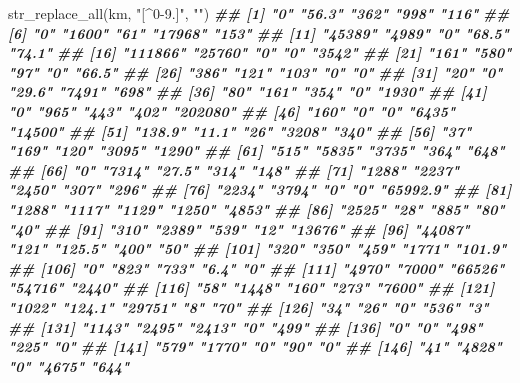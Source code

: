 \documentclass[11pt,german,a4paper]{article}
\newenvironment{Shaded}{\begin{snugshade}}{\end{snugshade}}
\newcommand{\DocumentationTok}[1]{\textcolor[rgb]{0.56,0.35,0.01}{\textbf{\textit{#1}}}}
\newcommand{\FunctionTok}[1]{\textcolor[rgb]{0.00,0.00,0.00}{#1}}
\newcommand{\NormalTok}[1]{#1}
\newcommand{\StringTok}[1]{\textcolor[rgb]{0.31,0.60,0.02}{#1}}
\begin{document}
\begin{Shaded}
\begin{Highlighting}[]
\FunctionTok{str\_replace\_all}\NormalTok{(km, }\StringTok{"[\^{}0{-}9.]"}\NormalTok{, }\StringTok{""}\NormalTok{)}
\DocumentationTok{\#\#   [1] "0"       "56.3"    "362"     "998"     "116"    }
\DocumentationTok{\#\#   [6] "0"       "1600"    "61"      "17968"   "153"    }
\DocumentationTok{\#\#  [11] "45389"   "4989"    "0"       "68.5"    "74.1"   }
\DocumentationTok{\#\#  [16] "111866"  "25760"   "0"       "0"       "3542"   }
\DocumentationTok{\#\#  [21] "161"     "580"     "97"      "0"       "66.5"   }
\DocumentationTok{\#\#  [26] "386"     "121"     "103"     "0"       "0"      }
\DocumentationTok{\#\#  [31] "20"      "0"       "29.6"    "7491"    "698"    }
\DocumentationTok{\#\#  [36] "80"      "161"     "354"     "0"       "1930"   }
\DocumentationTok{\#\#  [41] "0"       "965"     "443"     "402"     "202080" }
\DocumentationTok{\#\#  [46] "160"     "0"       "0"       "6435"    "14500"  }
\DocumentationTok{\#\#  [51] "138.9"   "11.1"    "26"      "3208"    "340"    }
\DocumentationTok{\#\#  [56] "37"      "169"     "120"     "3095"    "1290"   }
\DocumentationTok{\#\#  [61] "515"     "5835"    "3735"    "364"     "648"    }
\DocumentationTok{\#\#  [66] "0"       "7314"    "27.5"    "314"     "148"    }
\DocumentationTok{\#\#  [71] "1288"    "2237"    "2450"    "307"     "296"    }
\DocumentationTok{\#\#  [76] "2234"    "3794"    "0"       "0"       "65992.9"}
\DocumentationTok{\#\#  [81] "1288"    "1117"    "1129"    "1250"    "4853"   }
\DocumentationTok{\#\#  [86] "2525"    "28"      "885"     "80"      "40"     }
\DocumentationTok{\#\#  [91] "310"     "2389"    "539"     "12"      "13676"  }
\DocumentationTok{\#\#  [96] "44087"   "121"     "125.5"   "400"     "50"     }
\DocumentationTok{\#\# [101] "320"     "350"     "459"     "1771"    "101.9"  }
\DocumentationTok{\#\# [106] "0"       "823"     "733"     "6.4"     "0"      }
\DocumentationTok{\#\# [111] "4970"    "7000"    "66526"   "54716"   "2440"   }
\DocumentationTok{\#\# [116] "58"      "1448"    "160"     "273"     "7600"   }
\DocumentationTok{\#\# [121] "1022"    "124.1"   "29751"   "8"       "70"     }
\DocumentationTok{\#\# [126] "34"      "26"      "0"       "536"     "3"      }
\DocumentationTok{\#\# [131] "1143"    "2495"    "2413"    "0"       "499"    }
\DocumentationTok{\#\# [136] "0"       "0"       "498"     "225"     "0"      }
\DocumentationTok{\#\# [141] "579"     "1770"    "0"       "90"      "0"      }
\DocumentationTok{\#\# [146] "41"      "4828"    "0"       "4675"    "644"    }

\end{Highlighting}
\end{Shaded}
\end{document}
